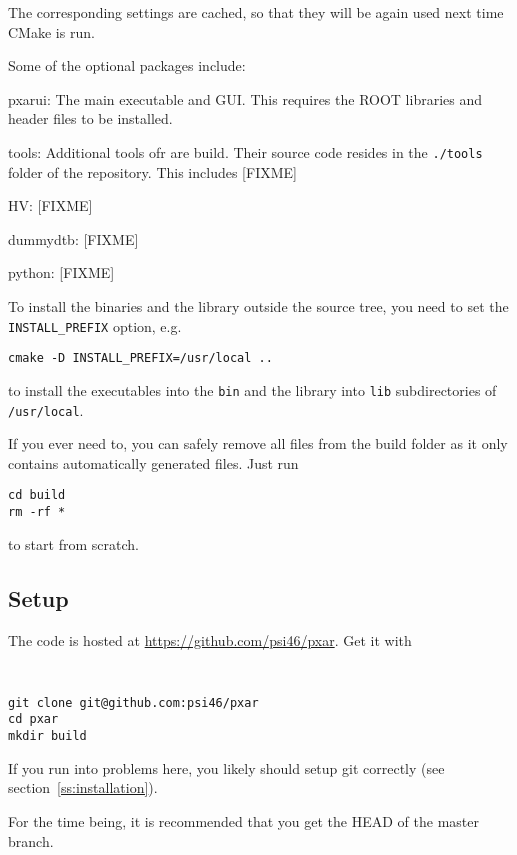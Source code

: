 The corresponding settings are cached, so that they will be again used
next time CMake is run.

Some of the optional packages include:
\begin{description}

\item{pxarui:}
The main executable and GUI. This requires the ROOT libraries and header files to be installed.

\item{tools:}
Additional tools ofr \pxar are build. Their source code resides in the \texttt{./tools} folder of the repository. This includes [FIXME]

\item{HV:}
[FIXME]

\item{dummydtb:}
[FIXME]

\item{python:}
[FIXME]

\end{description}

To install the binaries and the library outside the source tree, you
need to set the \texttt{INSTALL\_PREFIX} option, e.g.
\begin{verbatim}
cmake -D INSTALL_PREFIX=/usr/local ..
\end{verbatim}
to install the executables into the \texttt{bin} and the library into \texttt{lib} subdirectories of \texttt{/usr/local}.

If you ever need to, you can safely remove all files from the build folder as it only contains automatically generated files. Just run
\begin{verbatim}
cd build
rm -rf *
\end{verbatim}
to start from scratch.


\subsection{Setup}
\label{ss:setup}
The \pxar code is hosted at \url{https://github.com/psi46/pxar}. Get it with 
{\tt
\begin{verbatim}
git clone git@github.com:psi46/pxar 
cd pxar
mkdir build
\end{verbatim}
}
If you run into problems here, you likely should setup git correctly
(see section~\ref{ss:installation}). 

For the time being, it is recommended that you get the HEAD of the
master branch. 


